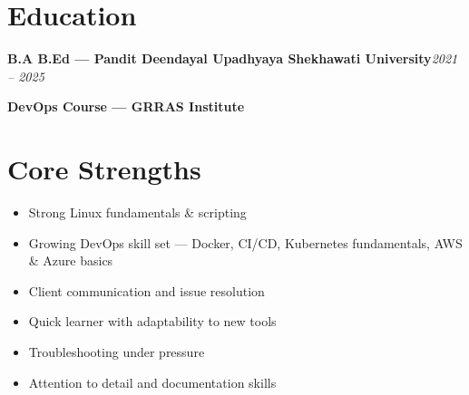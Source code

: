 \documentclass[11pt,a4paper]{article}
\newcommand{\role}[2]{%
  \noindent\textbf{#1}\hfill\textit{\textcolor{midgray}{#2}}\par\vspace{1pt}
}
\begin{document}
\section*{Education}
\small
\role{B.A B.Ed --- Pandit Deendayal Upadhyaya Shekhawati University}{2021 -- 2025}
\role{DevOps Course --- GRRAS Institute}{}

\section*{Core Strengths}
\small
\begin{itemize}
  \item Strong Linux fundamentals \& scripting
  \item Growing DevOps skill set --- Docker, CI/CD, Kubernetes fundamentals, AWS \& Azure basics
  \item Client communication and issue resolution
  \item Quick learner with adaptability to new tools
  \item Troubleshooting under pressure
  \item Attention to detail and documentation skills
\end{itemize}
\end{document}
